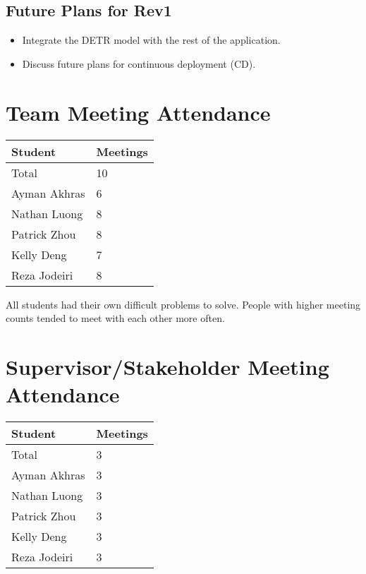 \documentclass{article}
\begin{document}
\subsection{Future Plans for Rev1}
\begin{itemize}
    \item Integrate the DETR model with the rest of the application.
    
    \item Discuss future plans for continuous deployment (CD).
\end{itemize}



\section{Team Meeting Attendance}

\begin{table}[H]
\centering
\begin{tabular}{ll}
\toprule
\textbf{Student} & \textbf{Meetings}\\
\midrule
Total & 10\\
Ayman Akhras & 6\\
Nathan Luong & 8\\
Patrick Zhou & 8\\
Kelly Deng & 7\\
Reza Jodeiri & 8\\
\bottomrule
\end{tabular}
\end{table}

All students had their own difficult problems to solve. People with higher meeting counts tended to meet with each other more often.
\section{Supervisor/Stakeholder Meeting Attendance}


\begin{table}[H]
\centering
\begin{tabular}{ll}
\toprule
\textbf{Student} & \textbf{Meetings}\\
\midrule
Total & 3\\
Ayman Akhras & 3\\
Nathan Luong & 3\\
Patrick Zhou & 3\\
Kelly Deng & 3\\
Reza Jodeiri & 3\\
\bottomrule
\end{tabular}
\end{table}
\end{document}
